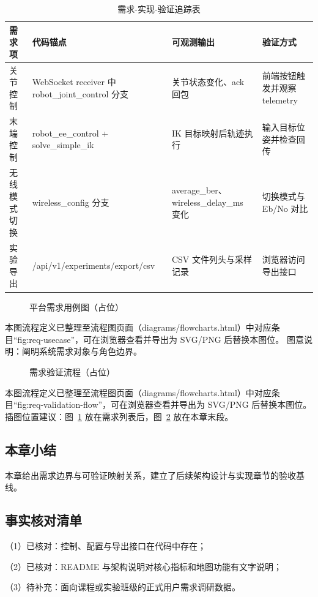 \begin{table}[htbp]
\centering
\caption{需求-实现-验证追踪表}
\label{tab:req-trace}
\begin{tabular}{p{}p{}p{}p{}}
\hline
需求项 & 代码锚点 & 可观测输出 & 验证方式 \\
\hline
关节控制 & WebSocket receiver 中 robot\_joint\_control 分支 & 关节状态变化、ack 回包 & 前端按钮触发并观察 telemetry \\
末端控制 & robot\_ee\_control + solve\_simple\_ik & IK 目标映射后轨迹执行 & 输入目标位姿并检查回传 \\
无线模式切换 & wireless\_config 分支 & average\_ber、wireless\_delay\_ms 变化 & 切换模式与 Eb/No 对比 \\
实验导出 & /api/v1/experiments/export/csv & CSV 文件列头与采样记录 & 浏览器访问导出接口 \\
\hline
\end{tabular}
\end{table}

\begin{figure}[htbp]
\centering
{}
\caption{平台需求用例图（占位）}
\label{fig:req-usecase}
\end{figure}

\noindent 本图流程定义已整理至流程图页面（diagrams/flowcharts.html）中对应条目“fig:req-usecase”，可在浏览器查看并导出为 SVG/PNG 后替换本图位。
\noindent 图意说明：阐明系统需求对象与角色边界。

\begin{figure}[htbp]
\centering
{}
\caption{需求验证流程（占位）}
\label{fig:req-validation-flow}
\end{figure}

\noindent 本图流程定义已整理至流程图页面（diagrams/flowcharts.html）中对应条目“fig:req-validation-flow”，可在浏览器查看并导出为 SVG/PNG 后替换本图位。
\noindent 插图位置建议：图~\ref{fig:req-usecase} 放在需求列表后，图~\ref{fig:req-validation-flow} 放在本章末段。

\subsection{本章小结}
本章给出需求边界与可验证映射关系，建立了后续架构设计与实现章节的验收基线。

\subsection{事实核对清单}
（1）已核对：控制、配置与导出接口在代码中存在；

（2）已核对：README 与架构说明对核心指标和地图功能有文字说明；

（3）待补充：面向课程或实验班级的正式用户需求调研数据。
